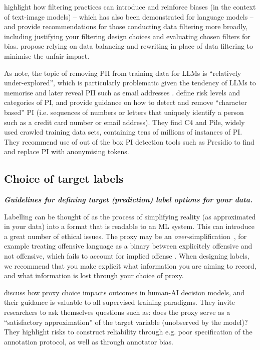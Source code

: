 \citet{hong_whos_2024} highlight how filtering practices can introduce and reinforce biases (in the context of text-image models) -- which has also been demonstrated for language models \citep{welbl_challenges_2021} -- and provide recommendations for those conducting data filtering more broadly, including justifying your filtering design choices and evaluating chosen filters for bias. \citet{anwar2024foundational} propose relying on data balancing and rewriting in place of data filtering to minimise the unfair impact.

As \citet{subramani_detecting_2023} note, the topic of removing PII from training data for LLMs is ``relatively under-explored'', which is particularly problematic given the tendency of LLMs to memorise and later reveal PII such as email addresses \citep{carlini_extracting_2021}. \citet{subramani_detecting_2023} define risk levels and categories of PI, and provide guidance on how to detect and remove ``character based'' PI (i.e. sequences of numbers or letters that uniquely identify a person such as a credit card number or email address). They find C4 and Pile, widely used crawled training data sets, containing tens of millions of instances of PI. They recommend use of out of the box PI detection tools such as Presidio to find and replace PI with anonymising tokens. 

\subsection{Choice of target labels}\noindent\textbf{\textit{Guidelines for defining target (prediction) label options for your data.}}
\newline 

\noindent Labelling can be thought of as the process of simplifying reality (as approximated in your data) into a format that is readable to an ML system. 
This can introduce a great number of ethical issues. 
The proxy may be an \emph{over}-simplification~\cite{Mulvin_Proxies_2021}, for example treating offensive language as a binary between explicitely offensive and not offensive, which fails to account for implied offense \citep[see][]{elsherief_latent_2021}. 
When designing labels, we recommend that you make explicit what information you are aiming to record, and what information is lost through your choice of proxy. 

\citet{guerdan_groundless_2023} discuss how proxy choice impacts outcomes in human-AI decision models, and their guidance is valuable to all supervised training paradigms. 
They invite researchers to ask themselves questions such as: does the proxy serve as a ``satisfactory approximation'' of the target variable (unobserved by the model)? 
They highlight risks to construct reliability through e.g. poor specification of the annotation protocol, as well as through annotator bias. %

